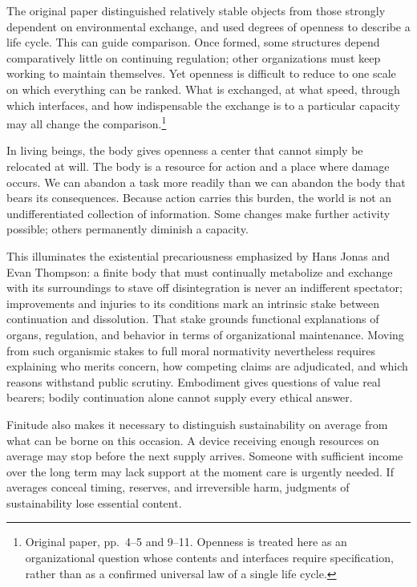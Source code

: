 \documentclass[
  english,
  11pt,
  oneside]{book}
\begin{document}
The original paper distinguished relatively stable objects from those strongly dependent on environmental exchange, and used degrees of openness to describe a life cycle. This can guide comparison. Once formed, some structures depend comparatively little on continuing regulation; other organizations must keep working to maintain themselves. Yet openness is difficult to reduce to one scale on which everything can be ranked. What is exchanged, at what speed, through which interfaces, and how indispensable the exchange is to a particular capacity may all change the comparison.\footnote{\hypertarget{ph-note-13}{}Original paper, pp.~4--5 and 9--11. Openness is treated here as an organizational question whose contents and interfaces require specification, rather than as a confirmed universal law of a single life cycle.}

In living beings, the body gives openness a center that cannot simply be relocated at will. The body is a resource for action and a place where damage occurs. We can abandon a task more readily than we can abandon the body that bears its consequences. Because action carries this burden, the world is not an undifferentiated collection of information. Some changes make further activity possible; others permanently diminish a capacity.

This illuminates the existential precariousness emphasized by Hans Jonas and Evan Thompson: a finite body that must continually metabolize and exchange with its surroundings to stave off disintegration is never an indifferent spectator; improvements and injuries to its conditions mark an intrinsic stake between continuation and dissolution. That stake grounds functional explanations of organs, regulation, and behavior in terms of organizational maintenance. Moving from such organismic stakes to full moral normativity nevertheless requires explaining who merits concern, how competing claims are adjudicated, and which reasons withstand public scrutiny. Embodiment gives questions of value real bearers; bodily continuation alone cannot supply every ethical answer.

Finitude also makes it necessary to distinguish sustainability on average from what can be borne on this occasion. A device receiving enough resources on average may stop before the next supply arrives. Someone with sufficient income over the long term may lack support at the moment care is urgently needed. If averages conceal timing, reserves, and irreversible harm, judgments of sustainability lose essential content.
\end{document}
